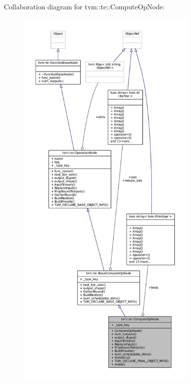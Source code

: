 Collaboration diagram for tvm\+:\+:te\+:\+:Compute\+Op\+Node\+:
\nopagebreak
\begin{figure}[H]
\begin{center}
\leavevmode
\includegraphics[height=550pt]{classtvm_1_1te_1_1ComputeOpNode__coll__graph}
\end{center}
\end{figure}
